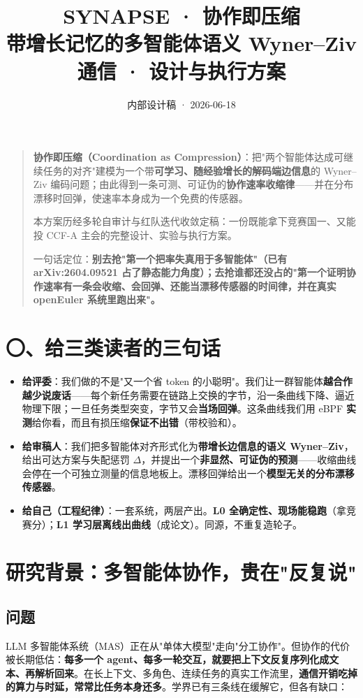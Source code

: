 \documentclass[UTF8,fontset=windows,11pt]{ctexart}
\title{\vspace{-1.2cm}\textbf{SYNAPSE · 协作即压缩}\\[2mm]
\large 带增长记忆的多智能体语义 Wyner--Ziv 通信 · 设计与执行方案}
\author{}
\date{内部设计稿 · 2026-06-18}
\newcommand{\key}[1]{\textbf{\textcolor{NavyBlue}{#1}}}
\begin{document}
\maketitle
\vspace{-1.0cm}

\begin{quote}\small\color{black!80}
\key{协作即压缩（Coordination as Compression）}：把"两个智能体达成可继续任务的对齐"建模为一个带\textbf{可学习、随经验增长的解码端边信息}的 Wyner--Ziv 编码问题；由此得到一条可测、可证伪的\textbf{协作速率收缩律}——并在分布漂移时回弹，使速率本身成为一个免费的传感器。

本方案历经多轮自审计与红队迭代收敛定稿：一份既能拿下竞赛国一、又能投 CCF-A 主会的完整设计、实验与执行方案。

一句话定位：\textbf{别去抢"第一个把率失真用于多智能体"（已有 arXiv:2604.09521 占了静态能力角度）；去抢谁都还没占的"第一个证明协作速率有一条会收缩、会回弹、还能当漂移传感器的时间律，并在真实 openEuler 系统里跑出来"。}
\end{quote}

\section*{〇、给三类读者的三句话}
\begin{itemize}
\item \key{给评委}：我们做的不是"又一个省 token 的小聪明"。我们让一群智能体\textbf{越合作越少说废话}——每个新任务需要在链路上交换的字节，沿一条曲线下降、逼近物理下限；一旦任务类型突变，字节又会\textbf{当场回弹}。这条曲线我们用 eBPF \textbf{实测}给你看，而且有损压缩\textbf{保证不出错}（带校验和）。
\item \key{给审稿人}：我们把多智能体对齐形式化为\textbf{带增长边信息的语义 Wyner--Ziv}，给出可达方案与失配惩罚 $\Delta$，并提出一个\textbf{非显然、可证伪的预测}——收缩曲线会停在一个可独立测量的信息地板上。漂移回弹给出一个\textbf{模型无关的分布漂移传感器}。
\item \key{给自己（工程纪律）}：一套系统，两层产出。\textbf{L0 全确定性、现场能稳跑}（拿竞赛分）；\textbf{L1 学习层离线出曲线}（成论文）。同源，不重复造轮子。
\end{itemize}

\section{研究背景：多智能体协作，贵在"反复说"}

\subsection{问题}
LLM 多智能体系统（MAS）正在从"单体大模型"走向"分工协作"。但协作的代价被长期低估：\textbf{每多一个 agent、每多一轮交互，就要把上下文反复序列化成文本、再解析回来}。在长上下文、多角色、连续任务的真实工作流里，\textbf{通信开销吃掉的算力与时延，常常比任务本身还多}。学界已有三条线在缓解它，但各有缺口：
\end{document}
